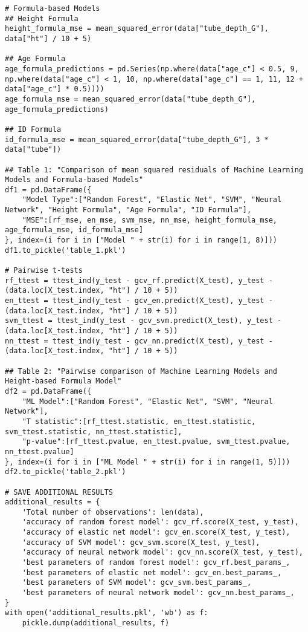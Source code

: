 \documentclass[11pt]{article}
\begin{document}
\begin{verbatim}
# Formula-based Models
## Height Formula
height_formula_mse = mean_squared_error(data["tube_depth_G"], data["ht"] / 10 + 5)

## Age Formula
age_formula_predictions = pd.Series(np.where(data["age_c"] < 0.5, 9, np.where(data["age_c"] < 1, 10, np.where(data["age_c"] == 1, 11, 12 + data["age_c"] * 0.5))))
age_formula_mse = mean_squared_error(data["tube_depth_G"], age_formula_predictions)

## ID Formula
id_formula_mse = mean_squared_error(data["tube_depth_G"], 3 * data["tube"])

## Table 1: "Comparison of mean squared residuals of Machine Learning Models and Formula-based Models"
df1 = pd.DataFrame({
    "Model Type":["Random Forest", "Elastic Net", "SVM", "Neural Network", "Height Formula", "Age Formula", "ID Formula"],
    "MSE":[rf_mse, en_mse, svm_mse, nn_mse, height_formula_mse, age_formula_mse, id_formula_mse]
}, index=(i for i in ["Model " + str(i) for i in range(1, 8)]))
df1.to_pickle('table_1.pkl')

# Pairwise t-tests
rf_ttest = ttest_ind(y_test - gcv_rf.predict(X_test), y_test - (data.loc[X_test.index, "ht"] / 10 + 5))
en_ttest = ttest_ind(y_test - gcv_en.predict(X_test), y_test - (data.loc[X_test.index, "ht"] / 10 + 5))
svm_ttest = ttest_ind(y_test - gcv_svm.predict(X_test), y_test - (data.loc[X_test.index, "ht"] / 10 + 5))
nn_ttest = ttest_ind(y_test - gcv_nn.predict(X_test), y_test - (data.loc[X_test.index, "ht"] / 10 + 5))

## Table 2: "Pairwise comparison of Machine Learning Models and Height-based Formula Model"
df2 = pd.DataFrame({
    "ML Model":["Random Forest", "Elastic Net", "SVM", "Neural Network"],
    "T statistic":[rf_ttest.statistic, en_ttest.statistic, svm_ttest.statistic, nn_ttest.statistic],
    "p-value":[rf_ttest.pvalue, en_ttest.pvalue, svm_ttest.pvalue, nn_ttest.pvalue]
}, index=(i for i in ["ML Model " + str(i) for i in range(1, 5)]))
df2.to_pickle('table_2.pkl')

# SAVE ADDITIONAL RESULTS
additional_results = {
    'Total number of observations': len(data), 
    'accuracy of random forest model': gcv_rf.score(X_test, y_test), 
    'accuracy of elastic net model': gcv_en.score(X_test, y_test),
    'accuracy of SVM model': gcv_svm.score(X_test, y_test),
    'accuracy of neural network model': gcv_nn.score(X_test, y_test),
    'best parameters of random forest model': gcv_rf.best_params_,
    'best parameters of elastic net model': gcv_en.best_params_,
    'best parameters of SVM model': gcv_svm.best_params_,
    'best parameters of neural network model': gcv_nn.best_params_,
}
with open('additional_results.pkl', 'wb') as f:
    pickle.dump(additional_results, f)

\end{verbatim}
\end{document}

